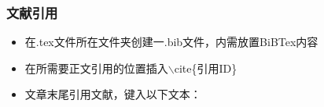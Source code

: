 \documentclass[11pt]{article}
\begin{document}
    \subsubsection{文献引用}
    \begin{itemize}
    	\item 在.tex文件所在文件夹创建一.bib文件，内需放置BiBTex内容
    	\item 在所需要正文引用的位置插入$\backslash$cite\{引用ID\}
    	\item 文章末尾引用文献，键入以下文本：
    	\begin{center}
    	\end{center}
    \end{itemize}
    

    
    
    
\end{document}

